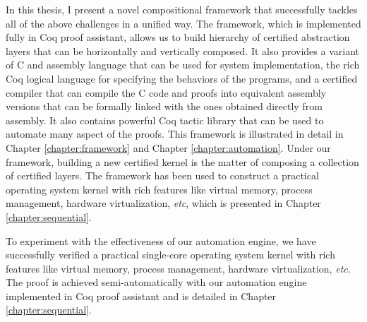 {In this thesis, I present a novel compositional  framework that successfully
tackles all of the above challenges in a unified way. The framework,
which is implemented fully in Coq proof assistant, allows
us to build hierarchy of certified abstraction layers that can be horizontally
and vertically composed. It also provides a variant of C and assembly language
that can be used for system implementation, the rich Coq logical language
for specifying the behaviors of the programs, and a certified compiler that can compile
the C code and proofs into equivalent assembly versions that can be formally linked
with the ones obtained directly from assembly. It also contains powerful
Coq tactic library that can be used to automate many aspect of the proofs.
This framework is illustrated in
detail in Chapter \ref{chapter:framework} and Chapter \ref{chapter:automation}.
Under our framework, building a new certified kernel is the matter of
composing a collection of certified layers. The framework has been used to
construct a practical operating system kernel with rich features like virtual
memory, process management, hardware virtualization, {\it etc}, which is
presented in Chapter \ref{chapter:sequential}.
}

To experiment with the effectiveness of our automation engine, 
we have successfully verified a practical single-core
operating system kernel with rich features like virtual
memory, process management, hardware virtualization, {\it etc}.
The proof is achieved semi-automatically with our automation
engine implemented in Coq proof assistant and is detailed
in Chapter \ref{chapter:sequential}.


